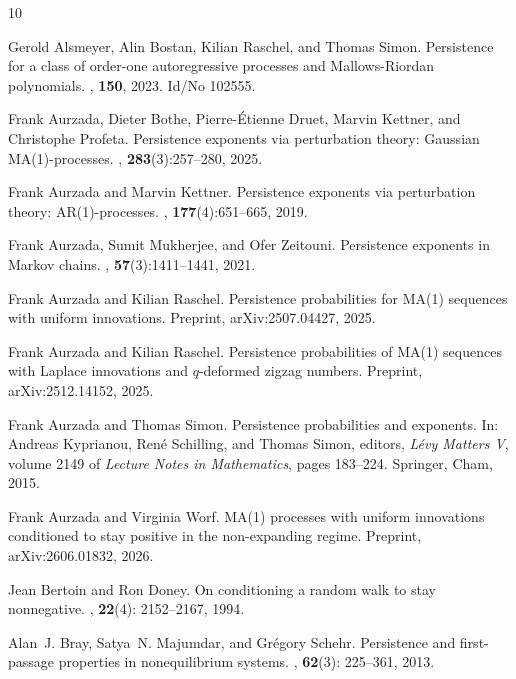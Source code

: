 \documentclass[12pt]{article}
\newcommand{\1}{\mathds{1}}
\theoremstyle{definition}
\theoremstyle{plain}
\theoremstyle{remark}
\begin{document}
\begin{thebibliography}{10}

Gerold Alsmeyer, Alin Bostan, Kilian Raschel, and Thomas Simon.
\newblock Persistence for a class of order-one autoregressive processes and
  {Mallows}-{Riordan} polynomials.
, {\bf 150}, 2023.
\newblock Id/No 102555.



Frank Aurzada, Dieter Bothe, Pierre-\'Etienne Druet, Marvin Kettner, and
  Christophe Profeta.
\newblock Persistence exponents via perturbation theory: {G}aussian
  {MA}(1)-processes.
, {\bf 283}(3):257--280, 2025.

Frank Aurzada and Marvin Kettner.
\newblock Persistence exponents via perturbation theory: {AR}(1)-processes.
, {\bf 177}(4):651--665, 2019.

Frank Aurzada, Sumit Mukherjee, and Ofer Zeitouni.
\newblock Persistence exponents in {Markov} chains.
, {\bf 57}(3):1411--1441,
  2021.

Frank Aurzada and Kilian Raschel.
\newblock Persistence probabilities for {MA}(1) sequences with uniform innovations. 
\newblock Preprint,
  arXiv:2507.04427, 2025.

Frank Aurzada and Kilian Raschel.
\newblock Persistence probabilities of {MA}(1) sequences with {L}aplace innovations and $q$-deformed zigzag numbers. 
\newblock Preprint, arXiv:2512.14152, 2025.
     

Frank Aurzada and Thomas Simon.
\newblock Persistence probabilities and exponents.
\newblock In: Andreas Kyprianou, Ren{\'e} Schilling, and Thomas Simon, editors,
  {\em L\'evy Matters V}, volume 2149 of {\em Lecture Notes in Mathematics},
  pages 183--224. Springer, Cham, 2015.

Frank Aurzada and Virginia Worf.
\newblock MA(1) processes with uniform innovations conditioned to stay positive in the non-expanding regime.
\newblock Preprint, arXiv:2606.01832, 2026.

Jean Bertoin and Ron Doney.
\newblock On conditioning a random walk to stay nonnegative. 
, {\bf 22}(4): 2152--2167, 1994.

Alan~J. Bray, Satya~N. Majumdar, and Gr{\'e}gory Schehr.
\newblock Persistence and first-passage properties in nonequilibrium systems.
, {\bf 62}(3): 225--361, 2013.


\end{thebibliography}
\end{document}
